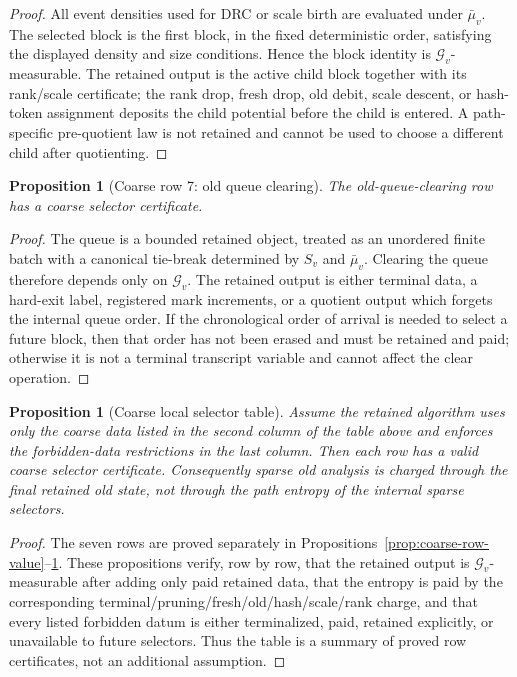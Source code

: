\documentclass[11pt]{article}
\newtheorem{proposition}[theorem]{Proposition}
\theoremstyle{remark}
\newcommand{\G}{\mathcal G}
\begin{document}
\begin{proof}
All event densities used for DRC or scale birth are evaluated under $\bar\mu_v$.  The selected block is the first block, in the fixed deterministic order, satisfying the displayed density and size conditions.  Hence the block identity is $\G_v$-measurable.  The retained output is the active child block together with its rank/scale certificate; the rank drop, fresh drop, old debit, scale descent, or hash-token assignment deposits the child potential before the child is entered.  A path-specific pre-quotient law is not retained and cannot be used to choose a different child after quotienting.
\end{proof}

\begin{proposition}[Coarse row 7: old queue clearing]\label{prop:coarse-row-old-queue}
The old-queue-clearing row has a coarse selector certificate.
\end{proposition}

\begin{proof}
The queue is a bounded retained object, treated as an unordered finite batch with a canonical tie-break determined by $S_v$ and $\bar\mu_v$.  Clearing the queue therefore depends only on $\G_v$.  The retained output is either terminal data, a hard-exit label, registered mark increments, or a quotient output which forgets the internal queue order.  If the chronological order of arrival is needed to select a future block, then that order has not been erased and must be retained and paid; otherwise it is not a terminal transcript variable and cannot affect the clear operation.
\end{proof}

\begin{proposition}[Coarse local selector table]\label{prop:coarse-table}
Assume the retained algorithm uses only the coarse data listed in the second column of the table above and enforces the forbidden-data restrictions in the last column.  Then each row has a valid coarse selector certificate.  Consequently sparse old analysis is charged through the final retained old state, not through the path entropy of the internal sparse selectors.
\end{proposition}

\begin{proof}
The seven rows are proved separately in Propositions~\ref{prop:coarse-row-value}--\ref{prop:coarse-row-old-queue}.  These propositions verify, row by row, that the retained output is $\G_v$-measurable after adding only paid retained data, that the entropy is paid by the corresponding terminal/pruning/fresh/old/hash/scale/rank charge, and that every listed forbidden datum is either terminalized, paid, retained explicitly, or unavailable to future selectors.  Thus the table is a summary of proved row certificates, not an additional assumption.
\end{proof}
\end{document}
